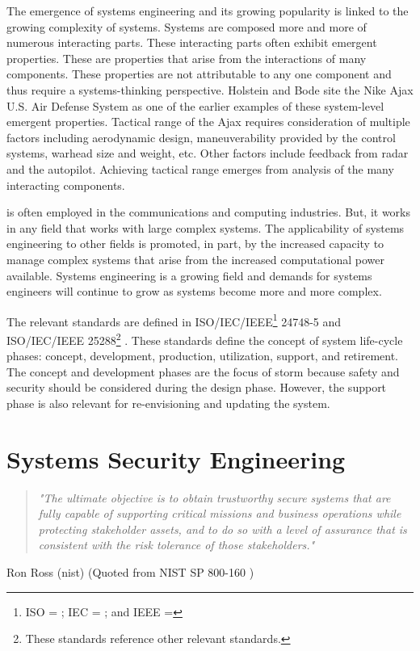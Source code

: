 \documentclass[../../main/main.tex]{subfiles}
\begin{document}
The emergence of systems engineering and its growing popularity is linked to the growing complexity of systems.  Systems are composed more and more of numerous interacting parts.  These interacting parts often exhibit emergent properties.  These are properties that arise from the interactions of many components.  These properties are not attributable to any one component and thus require a systems-thinking perspective. Holstein and Bode site the Nike Ajax U.S. Air Defense System as one of the earlier examples of these system-level emergent properties. Tactical range of the Ajax requires consideration of multiple factors including aerodynamic design, maneuverability provided by the control systems, warhead size and weight, etc.  Other factors include feedback from radar and the autopilot.  Achieving tactical range emerges from analysis of the many interacting components.  

 is often employed in the communications and computing industries. But, it works in any field that works with large complex systems.  The applicability of systems engineering to other fields is promoted, in part, by the increased capacity to manage complex systems that arise from the increased computational power available.  Systems engineering is a growing field and demands for systems engineers will continue to grow as systems become more and more complex.

The relevant  standards are defined in ISO/IEC/IEEE\footnote{ISO = ; IEC = ; and IEEE = } 24748-5 \cite{iso247482017} and ISO/IEC/IEEE 25288\footnote{These standards reference other relevant standards.} \cite{iso15288}.  These standards define the concept of system life-cycle phases: concept, development, production, utilization, support, and retirement.  The concept and development phases are the focus of \gls{storm} because safety and security should be considered during the design phase.  However, the support phase is also relevant for re-envisioning and updating the system.  

\section{Systems Security Engineering}\label{sesc:sse}
\begin{quote}
\textit{"The ultimate objective is to obtain trustworthy secure systems that are fully capable of supporting critical missions and business operations while protecting stakeholder assets, and to do so with a level of assurance that is consistent with the risk tolerance of those stakeholders."}
\end{quote}
\begin{flushright} Ron Ross (\gls{nist}) (Quoted from NIST SP 800-160 \cite{NIST800160}) \end{flushright} 
\end{document}
